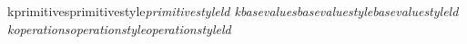 \pagestyle{fancy}
\fancyhf{}
\renewcommand{\headrulewidth}{0pt}



\makeatletter
\lst@InstallFamily k{primitives}{primitivestyle}\slshape{primitivestyle}{}ld
\lst@InstallFamily k{basevalues}{basevaluestyle}\slshape{basevaluestyle}{}ld
\lst@InstallFamily k{operations}{operationstyle}\slshape{operationstyle}{}ld
\makeatother



